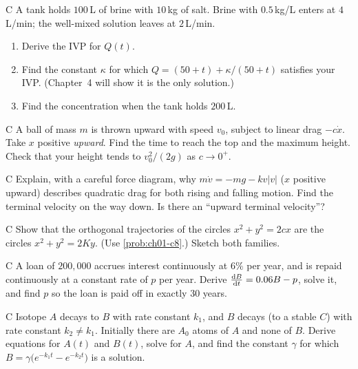 \begin{problem}{C}\label{prob:ch02-c2}
A tank holds $100$\,L of brine with $10$\,kg of salt. Brine with $0.5$\,kg/L
enters at $4$\,L/min; the well-mixed solution leaves at $2$\,L/min.
\begin{enumerate}[label=(\alph*)]
  \item Derive the IVP for $Q(t)$.
  \item Find the constant $\kappa$ for which $Q = (50 + t) + \kappa/(50+t)$
        satisfies your IVP. (Chapter~4 will show it is the only solution.)
  \item Find the concentration when the tank holds $200$\,L.
\end{enumerate}
\end{problem}

\begin{problem}{C}\label{prob:ch02-c3}
A ball of mass $m$ is thrown upward with speed $v_0$, subject to linear drag
$-c\dot{x}$. Take $x$ positive \emph{upward}. Find the time to reach the top
and the maximum height. Check that your height tends to $v_0^2/(2g)$ as
$c\to 0^+$.
\end{problem}

\begin{problem}{C}\label{prob:ch02-c4}
Explain, with a careful force diagram, why $m\dot v = -mg - kv|v|$ ($x$
positive upward) describes quadratic drag for both rising and falling
motion. Find the terminal velocity on the way down. Is there an ``upward
terminal velocity''?
\end{problem}

\begin{problem}{C}\label{prob:ch02-c5}
Show that the orthogonal trajectories of the circles $x^2 + y^2 = 2cx$ are
the circles $x^2 + y^2 = 2Ky$. (Use \cref{prob:ch01-c8}.) Sketch both families.
\end{problem}

\begin{problem}{C}\label{prob:ch02-c6}
A loan of $200{,}000$ accrues interest continuously at $6\%$ per year, and is
repaid continuously at a constant rate of $p$ per year. Derive
$\frac{\mathrm{d}B}{\mathrm{d}t} = 0.06B - p$, solve it, and find $p$ so the loan is paid off in
exactly $30$ years.
\end{problem}

\begin{problem}{C}\label{prob:ch02-c7}
Isotope $A$ decays to $B$ with rate constant $k_1$, and $B$ decays (to a
stable $C$) with rate constant $k_2\neq k_1$. Initially there are $A_0$ atoms
of $A$ and none of $B$. Derive equations for $A(t)$ and $B(t)$, solve for
$A$, and find the constant $\gamma$ for which
$B = \gamma\bigl(e^{-k_1t} - e^{-k_2t}\bigr)$ is a solution.
\end{problem}

